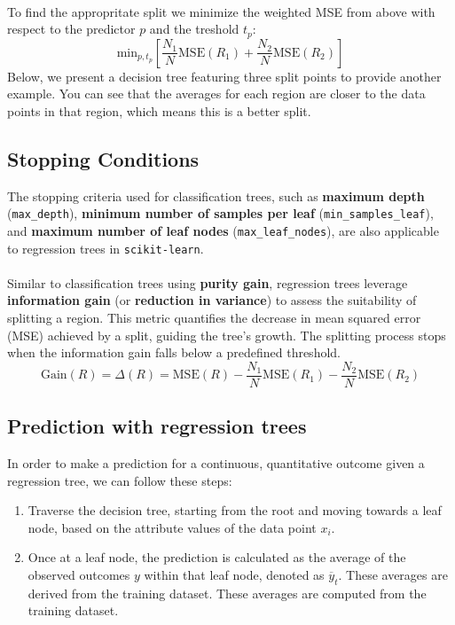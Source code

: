 \documentclass[11pt,a4paper]{report}
\begin{document}
\paragraph{}To find the appropritate split we minimize the weighted MSE from above with respect to the predictor $p$ and the treshold $t_p$:
$$\textrm{min}_{p,t_p}\left[\frac{N_1}{N}\textrm{MSE}(R_1)+\frac{N_2}{N}\textrm{MSE}(R_2)\right]$$
Below, we present a decision tree featuring three split points to provide another example. You can see that the averages for each region are closer to the data points in that region, which means this is a better split.\\
\subsection{Stopping Conditions}
The stopping criteria used for classification trees, such as \textbf{maximum depth} (\texttt{max\_depth}), \textbf{minimum number of samples per leaf} (\texttt{min\_samples\_leaf}), and \textbf{maximum number of leaf nodes} (\texttt{max\_leaf\_nodes}), are also applicable to regression trees in \texttt{scikit-learn}.
\paragraph{}Similar to classification trees using \textbf{purity gain}, regression trees leverage \textbf{information gain} (or \textbf{reduction in variance}) to assess the suitability of splitting a region. This metric quantifies the decrease in mean squared error (MSE) achieved by a split, guiding the tree's growth. The splitting process stops when the information gain falls below a predefined threshold.
$$\textrm{Gain}(R) = \Delta(R) = \textrm{MSE}(R)-\frac{N_1}{N}\textrm{MSE}(R_1)-\frac{N_2}{N}\textrm{MSE}(R_2)$$
\subsection{Prediction with regression trees}
In order to make a prediction for a continuous, quantitative outcome given a regression tree, we can follow these steps:
\begin{enumerate}
\item Traverse the decision tree, starting from the root and moving towards a leaf node, based on the attribute values of the data point $x_i$.
\item Once at a leaf node, the prediction is calculated as the average of the observed outcomes $y$ within that leaf node, denoted as $\overline{y}_t$. These averages are derived from the training dataset. These averages are computed from the training dataset.
\end{enumerate}
\end{document}
